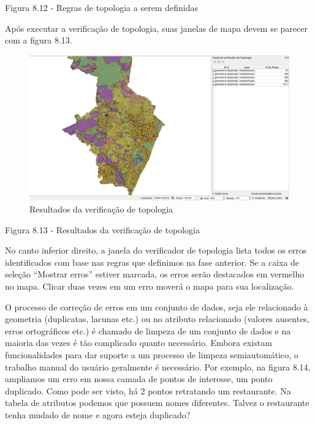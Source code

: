 \documentclass[
]{book}
\begin{document}
Figura 8.12 - Regras de topologia a serem definidas

Após executar a verificação de topologia, suas janelas de mapa devem se parecer com a figura 8.13.

\begin{figure}
\centering
\includegraphics{media/modulo8/fig813.png}
\caption{Resultados da verificação de topologia}
\end{figure}

Figura 8.13 - Resultados da verificação de topologia

No canto inferior direito, a janela do verificador de topologia lista todos os erros identificados com base nas regras que definimos na fase anterior. Se a caixa de seleção ``Mostrar erros'' estiver marcada, os erros serão destacados em vermelho no mapa. Clicar duas vezes em um erro moverá o mapa para sua localização.

O processo de correção de erros em um conjunto de dados, seja ele relacionado à geometria (duplicatas, lacunas etc.) ou no atributo relacionado (valores ausentes, erros ortográficos etc.) é chamado de limpeza de um conjunto de dados e na maioria das vezes é tão complicado quanto necessário. Embora existam funcionalidades para dar suporte a um processo de limpeza semiautomático, o trabalho manual do usuário geralmente é necessário. Por exemplo, na figura 8.14, ampliamos um erro em nossa camada de pontos de interesse, um ponto duplicado. Como pode ser visto, há 2 pontos retratando um restaurante. Na tabela de atributos podemos que possuem nomes diferentes. Talvez o restaurante tenha mudado de nome e agora esteja duplicado?
\end{document}
